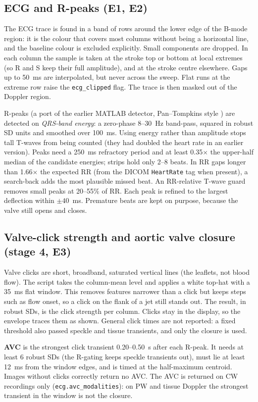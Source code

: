 \documentclass[10pt,a4paper]{article}
\newcommand{\code}[1]{\texttt{\small #1}}
\begin{document}
\subsection{ECG and R-peaks (E1, E2)}
The ECG trace is found in a band of rows around the lower edge of the B-mode region: it is the colour that covers most
columns without being a horizontal line, and the baseline colour is excluded explicitly. Small components are dropped.
In each column the sample is taken at the stroke top or bottom at local extremes (so R and S keep their full amplitude),
and at the stroke centre elsewhere. Gaps up to 50~ms are interpolated, but never across the sweep. Flat runs at the extreme row raise the
\code{ecg\_clipped} flag. The trace is then masked out of the Doppler region.

R-peaks (a port of the earlier MATLAB detector, Pan--Tompkins style \cite{pantompkins}) are detected on \emph{QRS-band energy}: a
zero-phase 8--30~Hz band-pass, squared in robust SD units and smoothed over 100~ms. Using energy rather than amplitude stops tall T-waves
from being counted (they had doubled the heart rate in an earlier version). Peaks need a 250~ms refractory period and at least
0.35$\times$ the upper-half median of the candidate energies; strips hold only 2--8 beats. In RR gaps longer than 1.66$\times$ the expected RR
(from the DICOM \code{HeartRate} tag when present), a search-back adds the most plausible missed beat. An RR-relative T-wave guard
removes small peaks at 20--55\% of RR. Each peak is refined to the largest deflection within $\pm40$~ms. Premature beats are kept on purpose,
because the valve still opens and closes.

\subsection{Valve-click strength and aortic valve closure (stage 4, E3)}
Valve clicks are short, broadband, saturated vertical lines (the leaflets, not blood flow). The script takes the column-mean level and
applies a white top-hat with a 35~ms flat window. This removes features narrower than a click but keeps steps such as flow onset, so a
click on the flank of a jet still stands out. The result, in robust SDs, is the click strength per column. Clicks stay in the
display, so the envelope traces them as shown. General click times are not reported: a fixed threshold also passed speckle and
tissue transients, and only the closure is used.

\textbf{AVC} is the strongest click transient 0.20--0.50~s after each R-peak. It needs at least 6 robust SDs (the R-gating keeps
speckle transients out), must lie at least 12~ms from the window edges, and is timed at the half-maximum centroid.
Images without clicks correctly return no AVC. The AVC is returned on CW recordings only (\code{ecg.avc\_modalities}):
on PW and tissue Doppler the strongest transient in the window is not the closure.
\end{document}
